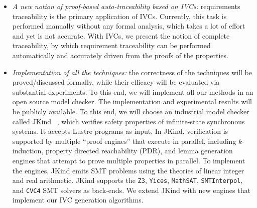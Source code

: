 \begin{itemize}
\item \emph{A new notion of proof-based auto-traceability based on IVCs:} requirements traceability is the primary application of IVCs. Currently, this task is performed manually without any formal analysis, which takes a lot of effort and yet is not accurate. With IVCs, we present the notion of complete traceability, by which requirement traceability can be performed automatically and accurately driven from the proofs of the properties.
\item \emph{Implementation of all the techniques:} the correctness of the techniques will be proved/discussed formally, while their efficacy will be evaluated via substantial experiments. To this end, we will implement all our methods in an open source model checker. The implementation and experimental results will be publicly available. To this  end, we will choose an industrial model checker called JKind ~\cite{jkind},
which verifies safety properties of infinite-state synchronous systems.
It accepts Lustre programs \cite{Halbwachs91:lustre} as input. In JKind, verification is supported by multiple ``proof engines'' that execute in parallel, including $k$-induction,
property directed reachability (PDR), and lemma generation engines that attempt to prove
multiple properties in parallel. To implement the engines,
JKind emits SMT problems using the theories of linear integer and real arithmetic. JKind supports the \texttt{Z3}, \texttt{Yices}, \texttt{MathSAT}, \texttt{SMTInterpol}, and \texttt{CVC4} SMT solvers as back-ends.  We extend JKind with new engines that implement our IVC generation algorithms.

\end{itemize}
